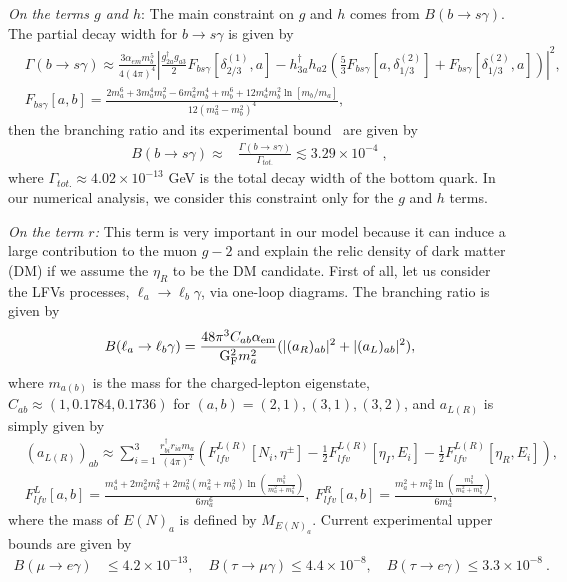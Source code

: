 \documentclass[%
showkeys,12pt,
preprint,preprintnumbers,nofootinbib,
groupedaddress,superscriptaddress,amsmath,amssymb]{revtex4}
\numberwithin{equation}{section}
\begin{document}
 {\it On the terms $g$ and $h$}:
 The main constraint on $g$ and $h$ comes from {$ B(b\to s\gamma)$}.
The partial decay width for $b\to s\gamma$ is given by
\begin{align}
&\Gamma(b\to s\gamma)\approx \frac{3 \alpha_{em} m_b^5}{4(4\pi)^4}
\left|
\frac{g^\dag_{2a} g_{a3}}2 F_{bs\gamma}[\delta_{2/3}^{(1)},a]-
h^\dag_{3a}h_{a2}\left(\frac53 F_{bs\gamma}[a,\delta_{1/3}^{(2)}] +  F_{bs\gamma}[\delta_{1/3}^{(2)},a] \right)
\right|^2,\\
&
F_{bs\gamma}[a,b]=\frac{2 m_a^6+3 m_a^4 m_b^2-6 m_a^2 m_b^4+ m_b^6+ 12 m_a^4 m_b^2\ln[m_b/m_a]}{12(m_a^2-m_b^2)^4},
\end{align}
 then the branching ratio and its experimental bound~\cite{Lees:2012wg} are
given by 
 \begin{align}
 B(b\to s\gamma)\approx
&\frac{\Gamma(b\to s\gamma)}{\Gamma_{tot.}} \lesssim 3.29\times 10^{-4}\;,
\end{align}
 where  $\Gamma_{tot.}\approx 4.02\times10^{-13}$ GeV is the 
total decay width of the bottom quark. In our numerical analysis, we consider this constraint only for the $g$ and $h$ terms.


{\it On the term $r$:}
This term is very important in our model because it can induce a large
contribution to the muon $g-2$ and explain the relic density of dark matter (DM)
if we assume the $\eta_R$ to be the DM candidate.
First of all, let us consider the LFVs processes,
$\ell_a\to\ell_b\gamma$, via one-loop diagrams. 
The branching ratio is given by
\begin{align}
 B(\ell_a\to\ell_b \gamma)
=
\frac{48\pi^3 C_{ab}\alpha_{\rm em}}{{\rm G_F^2} m_a^2 }(|(a_R)_{ab}|^2+|(a_L)_{ab}|^2),%
\end{align}
where $m_{a(b)}$ is the mass for the charged-lepton eigenstate, 
$C_{ab}\approx(1, 0.1784,0.1736)$ for $(a,b)=(2,1), (3,1), (3,2)$, and  $a_{L(R)}$  is simply given by
\begin{align}
&(a_{L(R)})_{ab} \approx
 \sum_{i=1}^3\frac{ r^\dag_{bi} r_{ia} m_a}{(4\pi)^2}
\left(F_{lfv}^{L(R)}[N_i,\eta^\pm]-\frac12 F_{lfv}^{L(R)}[\eta_{I},E_i]-\frac12 F_{lfv}^{L(R)}[\eta_{R},E_i]\right), \\
&F_{lfv}^{L}[a,b]=\frac{m_a^4+2 m_a^2m_b^2+2 m_b^2(m_a^2+m_b^2)\ln\left(\frac{m_b^2}{m_a^2+m_b^2}\right)}{6 m_a^6},\
F_{lfv}^{R}[a,b]=\frac{m_a^2+m_b^2 \ln\left(\frac{m_b^2}{m_a^2+m_b^2}\right)}{6 m_a^4},
\label{eq:g-2}
\end{align} 
where {the mass of $E(N)_a$ is defined by $M_{E(N)_a}$}.
%
Current experimental upper bounds are given 
by~\cite{TheMEG:2016wtm, Adam:2013mnn}
  \begin{align}
  B(\mu\rightarrow e\gamma) &\leq4.2\times10^{-13},\quad
B(\tau\rightarrow \mu\gamma)\leq4.4\times10^{-8},
\quad   B(\tau\rightarrow e\gamma) \leq3.3\times10^{-8}~.
 \label{expLFV}
 \end{align}
 
\end{document}

